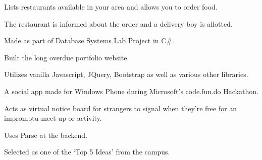 \documentclass[a4paper]{resume}
\begin{document}
\begin{minipage}[t]{0.66\textwidth}
\sectionspace %




\begin{tightitemize}
\item Lists restaurants available in your area and allows you to order food.
\item The restaurant is informed about the order and a delivery boy is allotted.
\item Made as part of Database Systems Lab Project in C\#.
\end{tightitemize}

\sectionspace %




\begin{tightitemize}
\item Built the long overdue portfolio website.
\item Utilizes vanilla Javascript, JQuery, Bootstrap as well as various other libraries.
\end{tightitemize}

\sectionspace %




\begin{tightitemize}
\item A social app made for Windows Phone during Microsoft’s code.fun.do Hackathon.
\item Acts as virtual notice board for strangers to signal when they’re free for an impromptu meet up or activity.
\item Uses Parse at the backend.
\item Selected as one of the ‘Top 5 Ideas’ from the campus.
\end{tightitemize}

\sectionspace %


\end{minipage}
\end{document}
